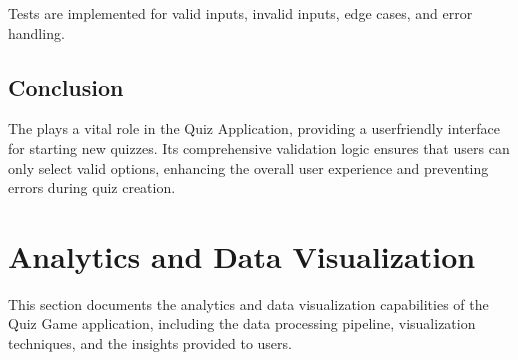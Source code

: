 \documentclass[letterpaper,10pt,english]{sphinxmanual}
\begin{document}
\sphinxAtStartPar
Tests are implemented for valid inputs, invalid inputs, edge cases, and error handling.


\subsection{Conclusion}
\label{\detokenize{forms:conclusion}}
\sphinxAtStartPar
The  plays a vital role in the Quiz Application, providing a user\sphinxhyphen{}friendly interface for starting new quizzes. Its comprehensive validation logic ensures that users can only select valid options, enhancing the overall user experience and preventing errors during quiz creation.

\sphinxstepscope


\section{Analytics and Data Visualization}
\label{\detokenize{analytics:analytics-and-data-visualization}}\label{\detokenize{analytics::doc}}
\sphinxAtStartPar
This section documents the analytics and data visualization capabilities of the
Quiz Game application, including the data processing pipeline, visualization techniques,
and the insights provided to users.
\end{document}
